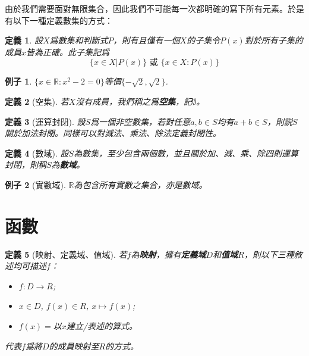 \documentclass[12pt]{article}
\newtheorem{definition}{定義}
\newtheorem*{example}{例子}
\begin{document}
    由於我們需要面對無限集合，因此我們不可能每一次都明確的寫下所有元素。於是有以下一種定義數集的方式：

    \begin{definition}
        設$X$爲數集和判斷式$P$，則有且僅有一個$X$的子集令$P(x)$對於所有子集的成員$x$皆為正確。此子集記爲$$\{x\in X|P(x)\}\textrm{ 或 }\{x\in X:P(x)\}$$
    \end{definition}

    \begin{example}
        $\{x\in\mathbb{R}:x^2-2=0\}$等價$\{-\sqrt{2},\sqrt{2}\}$.
    \end{example}

    \begin{definition}[空集]
        若$X$沒有成員，我們稱之爲\textbf{空集}，記$\emptyset$。
    \end{definition}

    \begin{definition}[運算封閉]
        設$S$爲一個非空數集，若對任意$a,b\in S$均有$a+b\in S$，則説$S$關於加法封閉。同樣可以對減法、乘法、除法定義封閉性。
    \end{definition}

    \begin{definition}[數域]
        設$S$為數集，至少包含兩個數，並且關於加、減、乘、除四則運算封閉，則稱$S$為\textbf{數域}。
    \end{definition}

    \begin{example}[實數域]
        $\mathbb{R}$為包含所有實數之集合，亦是數域。
    \end{example}

    \section*{函數}

    \begin{definition}[映射、定義域、值域]
        若$f$為\textbf{映射}，擁有\textbf{定義域}$D$和\textbf{值域}$R$，則以下三種敘述均可描述$f$：\begin{itemize}
            \item $f:D\to R$;
            \item $x\in D$, $f(x)\in R$, $x\mapsto f(x)$;
            \item $f(x)=$以$x$建立/表述的算式。
        \end{itemize}
        代表$f$爲將$D$的成員映射至$R$的方式。
    \end{definition}
\end{document}

